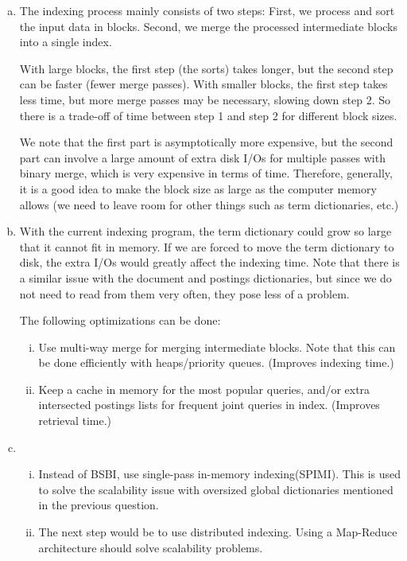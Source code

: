 \documentclass[10pt]{article}
\begin{document}
\begin{enumerate}[a)]
\item
The indexing process mainly consists of two steps: First, we process and sort the input data in blocks. Second, we merge the processed intermediate blocks into a single index.

With large blocks, the first step (the sorts) takes longer, but the second step can be faster (fewer merge passes). With smaller blocks, the first step takes less time, but more merge passes may be necessary, slowing down step 2. So there is a trade-off of time between step 1 and step 2 for different block sizes.

We note that the first part is asymptotically more expensive, but the second part can involve a large amount of extra disk I/Os for multiple passes with binary merge, which is very expensive in terms of time. Therefore, generally, it is a good idea to make the block size as large as the computer memory allows (we need to leave room for other things such as term dictionaries, etc.)

\item
With the current indexing program, the term dictionary could grow so large that it cannot fit in memory. If we are forced to move the term dictionary to disk, the extra I/Os would greatly affect the indexing time. Note that there is a similar issue with the document and postings dictionaries, but since we do not need to read from them very often, they pose less of a problem.

The following optimizations can be done:
\begin{enumerate}[(i)]
\item Use multi-way merge for merging intermediate blocks. Note that this can be done efficiently with heaps/priority queues. (Improves indexing time.)
\item Keep a cache in memory for the most popular queries, and/or extra intersected postings lists for frequent joint queries in index. (Improves retrieval time.)
\end{enumerate}
\item
\begin{enumerate}[(i)]
\item Instead of BSBI, use single-pass in-memory indexing(SPIMI). This is used to solve the scalability issue with oversized global dictionaries mentioned in the previous question.
\item The next step would be to use distributed indexing. Using a Map-Reduce architecture should solve scalability problems.
\end{enumerate}
\end{enumerate}
\end{document}
